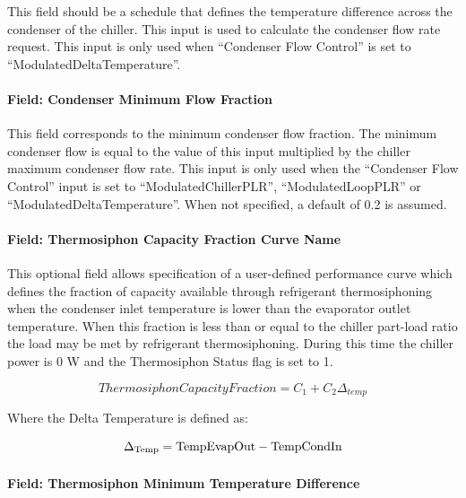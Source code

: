 This field should be a schedule that defines the temperature difference across the condenser of the chiller. This input is used to calculate the condenser flow rate request. This input is only used when ``Condenser Flow Control'' is set to ``ModulatedDeltaTemperature''.

\paragraph{Field: Condenser Minimum Flow Fraction}

This field corresponds to the minimum condenser flow fraction. The minimum condenser flow is equal to the value of this input multiplied by the chiller maximum condenser flow rate. This input is only used when the ``Condenser Flow Control'' input is set to ``ModulatedChillerPLR'', ``ModulatedLoopPLR'' or ``ModulatedDeltaTemperature''. When not specified, a default of 0.2 is assumed.

\paragraph{Field: Thermosiphon Capacity Fraction Curve Name}\label{thermosiphon-capacity-fraction-curve-name1}

This optional field allows specification of a user-defined performance curve which defines the fraction of capacity available through refrigerant thermosiphoning when the condenser inlet temperature is lower than the evaporator outlet temperature. When this fraction is less than or equal to the chiller part-load ratio the load may be met by refrigerant thermosiphoning. During this time the chiller power is 0 W and the Thermosiphon Status flag is set to 1.

\begin{equation}
    ThermosiphonCapacityFraction = {C_1} + {C_2}{\Delta_{temp}}
\end{equation}

Where the Delta Temperature is defined as:

\begin{equation}
{\Delta_{{\rm{Temp}}}}
    = {\rm{TempEvapOut  -  TempCondIn }}
\end{equation}

\paragraph{Field: Thermosiphon Minimum Temperature Difference}\label{thermosiphon-minimum-temperature-difference1}

